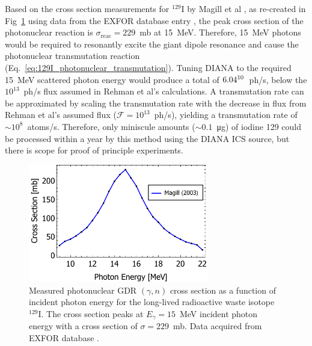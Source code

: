\documentclass[../main.tex]{subfiles}
\begin{document}
Based on the cross section measurements for $^{129}\mathrm{I}$ by Magill et al \cite{magill2003laser}, as re-created in Fig~\ref{fig:I129_cross_section_photon_energy} using data from the EXFOR database entry \cite{zerkin2018experimental}, the peak cross section of the photonuclear reaction is $\sigma_{\mathrm{reac}} = 229$~\si{\milli\barn} at 15~\si{\mega\electronvolt}. Therefore, 15~\si{\mega\electronvolt} photons would be required to resonantly excite the giant dipole resonance and cause the photonuclear transmutation reaction (Eq.~\ref{eq:129I_photonuclear_transmutation}). Tuning DIANA to the required 15~\si{\mega\electronvolt} scattered photon energy would produce a total of $6.04\time 10^{10}$~ph/\si{\second}, below the $10^{13}$~ph/\si{\second} flux assumed in Rehman et al's \cite{ur2017optimization} calculations. A transmutation rate can be approximated by scaling the transmutation rate with the decrease in flux from Rehman et al's assumed flux ($\mathcal{F}=10^{13}$~ph/\si{\second}), yielding a transmutation rate of $\sim10^{8}$~atoms/\si{\second}. Therefore, only miniscule amounts ($\sim0.1$~\si{\micro\gram}) of iodine 129 could be processed within a year by this method using the DIANA ICS source, but there is scope for proof of principle experiments.
\begin{figure}[!h]
\centering
\includegraphics[width=0.7\textwidth]{Figures/DIANA_Inverse_Compton_Source_Design/Iodine_129_cs_photon_energy.pdf}
\caption{Measured \cite{magill2003laser} photonuclear GDR $\left(\gamma,n\right)$ cross section as a function of incident photon energy for the long-lived radioactive waste isotope $^{129}\mathrm{I}$. The cross section peaks at $E_{\gamma} = 15$~\si{\mega\electronvolt} incident photon energy with a cross section of $\sigma = 229$~\si{\milli\barn}. Data acquired from EXFOR database \cite{zerkin2018experimental}.}
\label{fig:I129_cross_section_photon_energy}
\end{figure}
\end{document}
